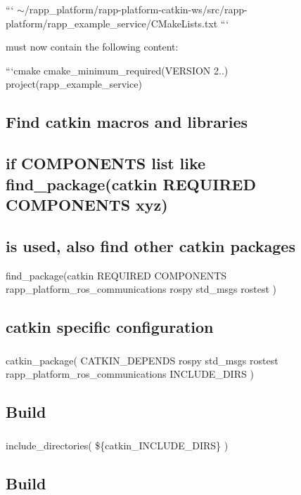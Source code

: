 ``` $\sim$/rapp\-\_\-platform/rapp-\/platform-\/catkin-\/ws/src/rapp-\/platform/rapp\-\_\-example\-\_\-service/\-C\-Make\-Lists.txt ```

must now contain the following content\-:

```cmake cmake\-\_\-minimum\-\_\-required(V\-E\-R\-S\-I\-O\-N 2..) project(rapp\-\_\-example\-\_\-service)

\subsection*{Find catkin macros and libraries}

\subsection*{if C\-O\-M\-P\-O\-N\-E\-N\-T\-S list like find\-\_\-package(catkin R\-E\-Q\-U\-I\-R\-E\-D C\-O\-M\-P\-O\-N\-E\-N\-T\-S xyz)}

\subsection*{is used, also find other catkin packages}

find\-\_\-package(catkin R\-E\-Q\-U\-I\-R\-E\-D C\-O\-M\-P\-O\-N\-E\-N\-T\-S rapp\-\_\-platform\-\_\-ros\-\_\-communications rospy std\-\_\-msgs rostest )

\subparagraph*{}

\subsection*{catkin specific configuration}

\subparagraph*{}

catkin\-\_\-package( C\-A\-T\-K\-I\-N\-\_\-\-D\-E\-P\-E\-N\-D\-S rospy std\-\_\-msgs rostest rapp\-\_\-platform\-\_\-ros\-\_\-communications I\-N\-C\-L\-U\-D\-E\-\_\-\-D\-I\-R\-S )

\subparagraph*{}

\subsection*{Build}

\subparagraph*{}

include\-\_\-directories( \$\{catkin\-\_\-\-I\-N\-C\-L\-U\-D\-E\-\_\-\-D\-I\-R\-S\} )

\subparagraph*{}

\subsection*{Build}

